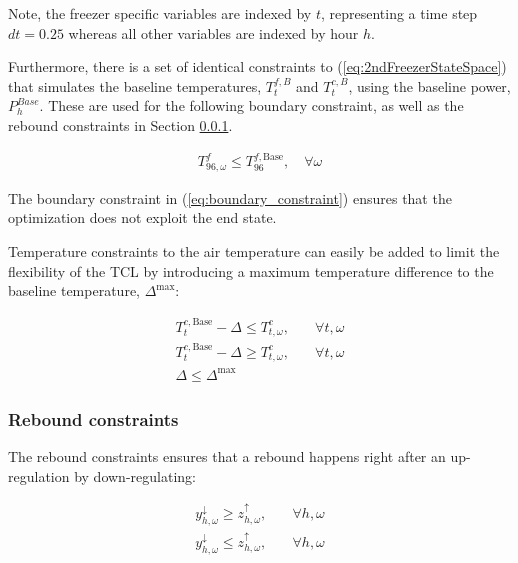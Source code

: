 Note, the freezer specific variables are indexed by $t$, representing a time step $dt = 0.25$ whereas all other variables are indexed by hour $h$.

Furthermore, there is a set of identical constraints to (\ref{eq:2ndFreezerStateSpace}) that simulates the baseline temperatures, $T^{f,B}_{t}$ and $T^{c,B}_{t}$, using the baseline power, $P^{Base}_{h}$. These are used for the following boundary constraint, as well as the rebound constraints in Section \ref{sec:rebound_constraints}.

\begin{align}\label{eq:boundary_constraint}
    T^{f}_{96,\omega} \leq T^{f, \text{Base}}_{96}, \quad \forall{\omega}
\end{align}

The boundary constraint in (\ref{eq:boundary_constraint}) ensures that the optimization does not exploit the end state.

Temperature constraints to the air temperature can easily be added to limit the flexibility of the TCL by introducing a maximum temperature difference to the baseline temperature, $\Delta^{\text{max}}$:

\begin{subequations}\label{eq:delta_max_constraints}
    \begin{align}
        T^{c,\text{Base}}_{t} - \Delta \leq T^{c}_{t, \omega}, \quad & \forall{t, \omega} \\
        T^{c,\text{Base}}_{t} - \Delta \geq T^{c}_{t, \omega}, \quad & \forall{t, \omega} \\
        \Delta \leq \Delta^{\text{max}}
    \end{align}
\end{subequations}

\subsubsection{Rebound constraints}\label{sec:rebound_constraints}

The rebound constraints ensures that a rebound happens right after an up-regulation by down-regulating:

\begin{subequations}\label{eq:rebound_constraints_1}
    \begin{align}
        y^{\downarrow}_{h, \omega} \geq z^{\uparrow}_{h, \omega}, \quad & \forall{h, \omega} \\
        y^{\downarrow}_{h, \omega} \leq z^{\uparrow}_{h, \omega}, \quad & \forall{h, \omega}
    \end{align}
\end{subequations}


